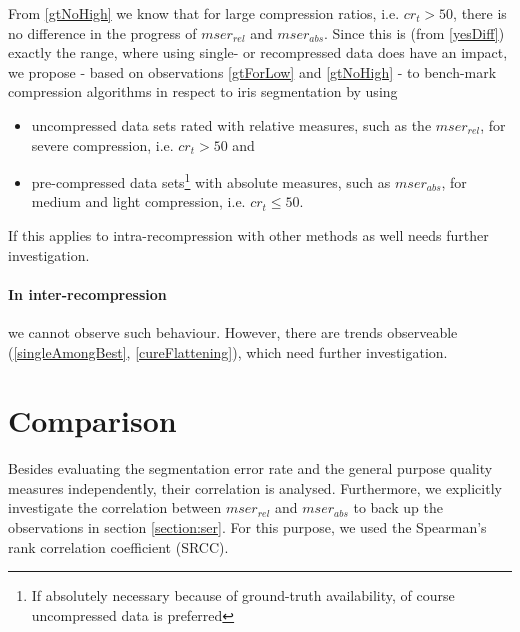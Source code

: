 \documentclass[10pt,twocolumn,letterpaper]{article}
\begin{document}
From \ref{gtNoHigh} we know that for large compression ratios, i.e. $cr_t > 50$, there is no difference in the progress of $mser_{rel}$ and $mser_{abs}$. Since this is (from \ref{yesDiff}) exactly the range, where using single- or recompressed data does have an impact, we propose - based on observations \ref{gtForLow} and \ref{gtNoHigh} - to bench-mark compression algorithms in respect to iris segmentation by using 
\begin{itemize}
	
	\item \vspace{-1.5mm} uncompressed data sets rated with relative measures, such as the $mser_{rel}$, for severe compression, i.e. $cr_t > 50$ and
	\item \vspace{-2mm}pre-compressed data sets\footnote{If absolutely necessary because of ground-truth availability, of course uncompressed data is preferred} with absolute measures, such as $mser_{abs}$, for medium and light compression, i.e. $cr_t \leq 50$.
\end{itemize}

If this applies to intra-recompression with other methods as well needs further investigation.

\paragraph{In inter-recompression} we cannot observe such behaviour. However, there are trends observeable (\ref{singleAmongBest}, \ref{cureFlattening}), which need further investigation. 


\section{Comparison}
\label{section:comparison}
Besides evaluating the segmentation error rate and the general purpose quality measures independently, their correlation is analysed. Furthermore, we explicitly investigate the correlation between $mser_{rel}$ and $mser_{abs}$ to back up the observations in section \ref{section:ser}.
For this purpose, we used the Spearman's rank correlation coefficient (SRCC).
\end{document}

